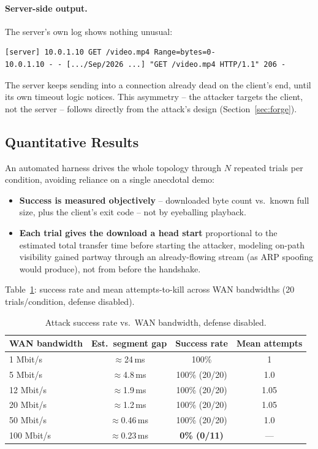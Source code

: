 \documentclass[11pt]{article}
\begin{document}
\paragraph{Server-side output.} The server's own log shows nothing
unusual:
\begin{lstlisting}
[server] 10.0.1.10 GET /video.mp4 Range=bytes=0-
10.0.1.10 - - [.../Sep/2026 ...] "GET /video.mp4 HTTP/1.1" 206 -
\end{lstlisting}
The server keeps sending into a connection already dead on the
client's end, until its own timeout logic notices. This asymmetry --
the attacker targets the client, not the server -- follows directly
from the attack's design (Section~\ref{sec:forge}).

\subsection{Quantitative Results}
\label{sec:quant}

An automated harness drives the whole topology through $N$ repeated
trials per condition, avoiding reliance on a single anecdotal demo:
\begin{itemize}[nosep]
  \item \textbf{Success is measured objectively} -- downloaded byte
    count vs.\ known full size, plus the client's exit code -- not by
    eyeballing playback.
  \item \textbf{Each trial gives the download a head start} proportional
    to the estimated total transfer time before starting the attacker,
    modeling on-path visibility gained partway through an already-flowing
    stream (as ARP spoofing would produce), not from before the handshake.
\end{itemize}

Table~\ref{tab:sweep}: success rate and mean attempts-to-kill across WAN
bandwidths (20 trials/condition, defense disabled).

\begin{table}[h]
\centering\small
\begin{tabular}{lccc}
\toprule
WAN bandwidth & Est.\ segment gap & Success rate & Mean attempts \\
\midrule
1 Mbit/s   & $\approx$24\,ms   & 100\%          & 1 \\
5 Mbit/s   & $\approx$4.8\,ms  & 100\% (20/20)  & 1.0 \\
12 Mbit/s  & $\approx$1.9\,ms  & 100\% (20/20)  & 1.05 \\
20 Mbit/s  & $\approx$1.2\,ms  & 100\% (20/20)  & 1.05 \\
50 Mbit/s  & $\approx$0.46\,ms & 100\% (20/20)  & 1.0 \\
100 Mbit/s & $\approx$0.23\,ms & \textbf{0\% (0/11)} & --- \\
\bottomrule
\end{tabular}
\caption{Attack success rate vs.\ WAN bandwidth, defense disabled.}
\label{tab:sweep}
\end{table}
\end{document}
